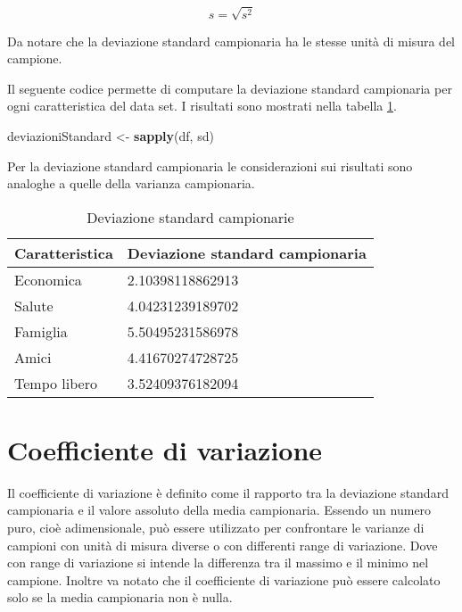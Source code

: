 \documentclass[]{book}
\newenvironment{Shaded}{\begin{snugshade}}{\end{snugshade}}
\newcommand{\KeywordTok}[1]{\textcolor[rgb]{0.13,0.29,0.53}{\textbf{#1}}}
\newcommand{\StringTok}[1]{\textcolor[rgb]{0.31,0.60,0.02}{#1}}
\newcommand{\NormalTok}[1]{#1}
\begin{document}
\[s = \sqrt{s^2}\]

Da notare che la deviazione standard campionaria ha le stesse unità di
misura del campione.

Il seguente codice permette di computare la deviazione standard
campionaria per ogni caratteristica del data set. I risultati sono
mostrati nella tabella \ref{tab:deviazione-standard-campionaria}.

\begin{Shaded}
\begin{Highlighting}[]
\NormalTok{deviazioniStandard <-}\StringTok{ }\KeywordTok{sapply}\NormalTok{(df, sd)}
\end{Highlighting}
\end{Shaded}

Per la deviazione standard campionaria le considerazioni sui risultati
sono analoghe a quelle della varianza campionaria.

\begin{table}

\caption{\label{tab:deviazione-standard-campionaria}Deviazione standard campionarie}
\centering
\begin{tabular}[t]{l|l}
\hline
Caratteristica & Deviazione standard campionaria\\
\hline
Economica & 2.10398118862913\\
\hline
Salute & 4.04231239189702\\
\hline
Famiglia & 5.50495231586978\\
\hline
Amici & 4.41670274728725\\
\hline
Tempo libero & 3.52409376182094\\
\hline
\end{tabular}
\end{table}

\section{Coefficiente di variazione}\label{coefficiente-di-variazione}

Il coefficiente di variazione è definito come il rapporto tra la
deviazione standard campionaria e il valore assoluto della media
campionaria. Essendo un numero puro, cioè adimensionale, può essere
utilizzato per confrontare le varianze di campioni con unità di misura
diverse o con differenti range di variazione. Dove con range di
variazione si intende la differenza tra il massimo e il minimo nel
campione. Inoltre va notato che il coefficiente di variazione può essere
calcolato solo se la media campionaria non è nulla.
\end{document}
